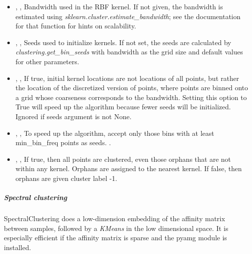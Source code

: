 \begin{itemize}
	\item {}, , Bandwidth used
in the RBF kernel. If not given, the bandwidth is estimated using
\textit{sklearn.cluster.estimate\_bandwidth}; see the documentation for that function for
 hints on scalability.
	\item {}, , Seeds used to initialize kernels. If not set, the seeds are
calculated by \textit{clustering.get\_bin\_seeds} with bandwidth as the grid size and
 default values for other parameters.
	\item {}, , If true,
 initial kernel locations are not locations of all points, but rather the
 location of the discretized version of points, where points are binned onto
 a grid whose coarseness corresponds to the bandwidth. Setting this option
to True will speed up the algorithm because fewer seeds will be initialized.
  Ignored if seeds argument is not None.
	\item {}, ,
To speed up the algorithm, accept only those bins with at least min\_bin\_freq
 points as seeds. .
	\item {}, , If true,
 then all points are clustered, even those orphans that are not within any
kernel. Orphans are assigned to the nearest kernel. If false, then orphans
are given cluster label -1. 
\end{itemize}


\subparagraph{Spectral clustering} \hfill
\label{subparagraph:Spectral}

SpectralClustering does a low-dimension embedding of the affinity matrix between
 samples, followed by a \textit{KMeans} in the low dimensional space. It is
especially efficient if the affinity matrix is sparse and the pyamg module is
installed.

